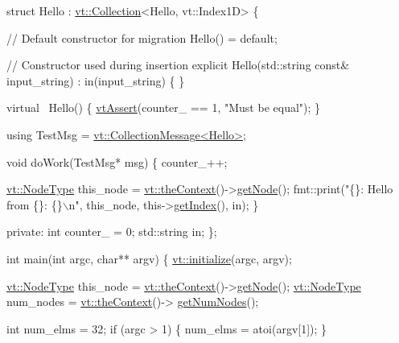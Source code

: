 \begin{DoxyCodeInclude}
\textcolor{keyword}{struct }Hello : \hyperlink{structvt_1_1vrt_1_1collection_1_1_collection}{vt::Collection}<Hello, vt::Index1D> \{

  \textcolor{comment}{// Default constructor for migration}
  Hello() = \textcolor{keywordflow}{default};

  \textcolor{comment}{// Constructor used during insertion}
  \textcolor{keyword}{explicit} Hello(std::string \textcolor{keyword}{const}& input\_string)
    : in(input\_string)
  \{ \}

  \textcolor{keyword}{virtual} ~Hello() \{
    \hyperlink{config__assert_8h_aeddd4990a496e91a0ca5d6c16437359b}{vtAssert}(counter\_ == 1, \textcolor{stringliteral}{"Must be equal"});
  \}

  \textcolor{keyword}{using} TestMsg = \hyperlink{structvt_1_1vrt_1_1collection_1_1_collection_message}{vt::CollectionMessage<Hello>};

  \textcolor{keywordtype}{void} doWork(TestMsg* msg) \{
    counter\_++;

    \hyperlink{namespacevt_a866da9d0efc19c0a1ce79e9e492f47e2}{vt::NodeType} this\_node = \hyperlink{namespacevt_a26551fe0e6e6a1371111df5b12c7e92c}{vt::theContext}()->\hyperlink{structvt_1_1ctx_1_1_context_a0d52c263ce8516546a67443d9a86fa5f}{getNode}();
    fmt::print(\textcolor{stringliteral}{"\{\}: Hello from \{\}: \{\}\(\backslash\)n"}, this\_node, this->\hyperlink{structvt_1_1vrt_1_1collection_1_1_indexable_a28d05f23e7a20e12e94b8235305c1e82}{getIndex}(), in);
  \}

\textcolor{keyword}{private}:
  \textcolor{keywordtype}{int} counter\_ = 0;
  std::string in;
\};

\textcolor{keywordtype}{int} main(\textcolor{keywordtype}{int} argc, \textcolor{keywordtype}{char}** argv) \{
  \hyperlink{namespacevt_aaa266774ea8339c58be0202b00fafa62}{vt::initialize}(argc, argv);

  \hyperlink{namespacevt_a866da9d0efc19c0a1ce79e9e492f47e2}{vt::NodeType} this\_node = \hyperlink{namespacevt_a26551fe0e6e6a1371111df5b12c7e92c}{vt::theContext}()->\hyperlink{structvt_1_1ctx_1_1_context_a0d52c263ce8516546a67443d9a86fa5f}{getNode}();
  \hyperlink{namespacevt_a866da9d0efc19c0a1ce79e9e492f47e2}{vt::NodeType} num\_nodes = \hyperlink{namespacevt_a26551fe0e6e6a1371111df5b12c7e92c}{vt::theContext}()->
      \hyperlink{structvt_1_1ctx_1_1_context_a7f41071aadf6d5fa9e1b6c703c5ff19d}{getNumNodes}();

  \textcolor{keywordtype}{int} num\_elms = 32;
  \textcolor{keywordflow}{if} (argc > 1) \{
    num\_elms = atoi(argv[1]);
  \}


\end{DoxyCodeInclude}
